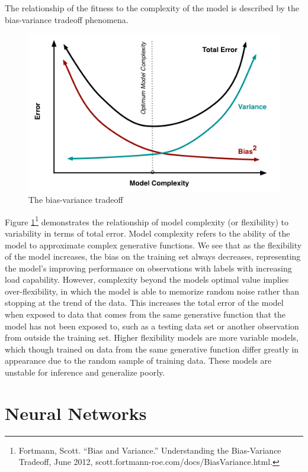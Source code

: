 \documentclass[12pt,twoside]{reedthesis}
\begin{document}
The relationship of the fitness to the complexity of the model is
described by the bias-variance tradeoff phenomena.
\begin{figure}
\centering
\includegraphics{figure/biasvariance.png}
\caption{\label{fig:biasvar}The bias-variance tradeoff}
\end{figure}
Figure \ref{fig:biasvar}\footnote{Fortmann, Scott. ``Bias and
  Variance.'' Understanding the Bias-Variance Tradeoff, June 2012,
  scott.fortmann-roe.com/docs/BiasVariance.html.} demonstrates the
relationship of model complexity (or flexibility) to variability in
terms of total error. Model complexity refers to the ability of the
model to approximate complex generative functions. We see that as the
flexibility of the model increases, the bias on the training set always
decreases, representing the model's improving performance on
observations with labels with increasing load capability. However,
complexity beyond the models optimal value implies over-flexibility, in
which the model is able to memorize random noise rather than stopping at
the trend of the data. This increases the total error of the model when
exposed to data that comes from the same generative function that the
model has not been exposed to, such as a testing data set or another
observation from outside the training set. Higher flexibility models are
more variable models, which though trained on data from the same
generative function differ greatly in appearance due to the random
sample of training data. These models are unstable for inference and
generalize poorly.

\section{Neural Networks}\label{neural-networks}
\end{document}
